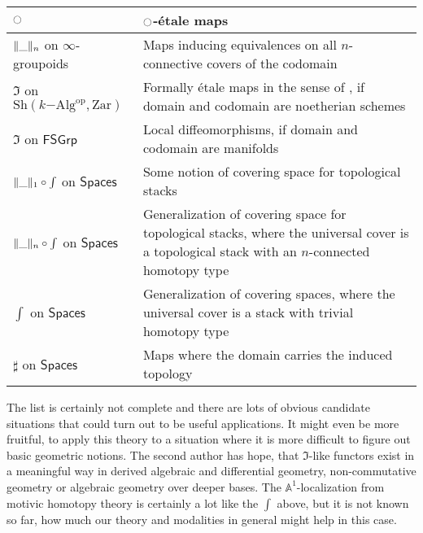 \documentclass[9pt,twosided]{amsart}
\newcommand{\shape}{\int}
\newcommand{\bA}{\mathbb A}
\newcommand{\Zar}{\ensuremath{\mathrm{Zar}}}
\newcommand{\FSGrp}{\ensuremath{\mathsf{FSGrp}}}
\newcommand{\Spaces}{\ensuremath{\mathsf{Spaces}}}
\begin{document}
\begin{center}
  \begin{tabular}{p{5cm}p{7cm}}
    \toprule
    ${\ocircle}$ & ${\ocircle}$-étale maps  \\
    \midrule
    $\trunc{n}{\_}$ on $\infty$-groupoids & Maps inducing equivalences on all $n$-connective covers of the codomain \\
    $\Im$ on $\mathrm{Sh}(k\mathrm{-Alg}^\mathrm{op} ,\Zar)$ & Formally étale maps in the sense of \cite{GrothendieckDieudonne}, if domain and codomain are noetherian schemes   \\
    $\Im$ on $\FSGrp$ & Local diffeomorphisms, if domain and codomain are manifolds \\
    $\trunc{1}{\_}\circ\shape$ on $\Spaces$ & Some notion of covering space for topological stacks \\
    $\trunc{n}{\_}\circ\shape$ on $\Spaces$ & Generalization of covering space for topological stacks, where the universal cover is a topological stack with an $n$-connected homotopy type \\
    $\shape$ on $\Spaces$ & Generalization of covering spaces, where the universal cover is a stack with trivial homotopy type \\
    $\sharp$ on $\Spaces$ & Maps where the domain carries the induced topology \\
    \bottomrule
  \end{tabular}
\end{center}
The list is certainly not complete and there are lots of obvious candidate situations that could turn out to be useful applications.
It might even be more fruitful, to apply this theory to a situation where it is more difficult to figure out basic geometric notions.
The second author has hope, that $\Im$-like functors exist in a meaningful way in derived algebraic and differential geometry, non-commutative geometry or algebraic geometry over deeper bases. The $\bA^1$-localization from motivic homotopy theory is certainly a lot like the $\shape$ above, but it is not known so far, how much our theory and modalities in general might help in this case.
\end{document}

